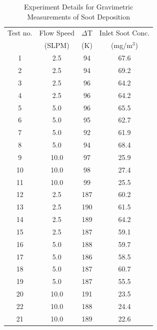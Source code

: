 \begin{table}[h!]
   \centering
   \caption[Experiment Details for Gravimetric Measurements of Soot Deposition]{Experiment Details for Gravimetric Measurements of Soot Deposition}
      \begin{tabular}{|c|c|c|c|}
         \hline
      Test no. & Flow Speed & $\Delta$T & Inlet Soot Conc.  \\
               & (SLPM)     & (K)       & (mg/m$^3$)        \\ \hline \hline
      1        & 2.5        &  94       &  67.6             \\ \hline
      2        & 2.5        &  94       &  69.2             \\ \hline
      3        & 2.5        &  96       &  64.2             \\ \hline
      4        & 2.5        &  96       &  64.2             \\ \hline
      5        & 5.0        &  96       &  65.5             \\ \hline
      6        & 5.0        &  95       &  62.7             \\ \hline
      7        & 5.0        &  92       &  61.9             \\ \hline
      8        & 5.0        &  94       &  68.4             \\ \hline
      9        & 10.0       &  97       &  25.9             \\ \hline
      10       & 10.0       &  98       &  27.4             \\ \hline
      11       & 10.0       &  99       &  25.5             \\ \hline
      12       & 2.5        &  187      &  60.2             \\ \hline
      13       & 2.5        &  190      &  61.5             \\ \hline
      14       & 2.5        &  189      &  64.2             \\ \hline
      15       & 2.5        &  187      &  59.1             \\ \hline
      16       & 5.0        &  188      &  59.7             \\ \hline
      17       & 5.0        &  186      &  58.5             \\ \hline
      18       & 5.0        &  187      &  60.7             \\ \hline
      19       & 5.0        &  187      &  55.5             \\ \hline
      20       & 10.0       &  191      &  23.5             \\ \hline
      22       & 10.0       &  188      &  24.4             \\ \hline
      21       & 10.0       &  189      &  22.6             \\ \hline
      \end{tabular}
   \label{tab:NIST_SDG}
\end{table}


